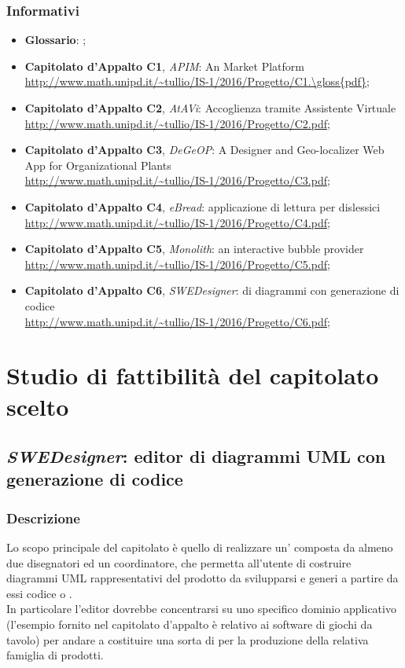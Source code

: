 		\subsubsection{Informativi}
		\begin{itemize}
			\item \textbf{Glossario}: \Glossario;
			\item \textbf{Capitolato d'Appalto C1}, \emph{APIM}: An  Market Platform
			\\ \url{http://www.math.unipd.it/~tullio/IS-1/2016/Progetto/C1.\gloss{pdf}};
			\item \textbf{Capitolato d'Appalto C2}, \emph{AtAVi}: Accoglienza tramite Assistente Virtuale
			\\ \url{http://www.math.unipd.it/~tullio/IS-1/2016/Progetto/C2.pdf};
			\item \textbf{Capitolato d'Appalto C3}, \emph{DeGeOP}: A Designer and Geo-localizer Web App for Organizational Plants
			\\ \url{http://www.math.unipd.it/~tullio/IS-1/2016/Progetto/C3.pdf};
			\item \textbf{Capitolato d'Appalto C4}, \emph{eBread}: applicazione di lettura per dislessici
			\\ \url{http://www.math.unipd.it/~tullio/IS-1/2016/Progetto/C4.pdf};
			\item \textbf{Capitolato d'Appalto C5}, \emph{Monolith}: an interactive bubble provider
			\\ \url{http://www.math.unipd.it/~tullio/IS-1/2016/Progetto/C5.pdf};
			\item \textbf{Capitolato d'Appalto C6}, \emph{SWEDesigner}:  di diagrammi  con generazione di codice
			\\ \url{http://www.math.unipd.it/~tullio/IS-1/2016/Progetto/C6.pdf};
		\end{itemize}


	
\section{Studio di fattibilità del capitolato scelto}
	\subsection{\emph{SWEDesigner}: editor di diagrammi UML con generazione di codice}
		\subsubsection{Descrizione}
		Lo scopo principale del capitolato è quello di realizzare un' composta da almeno due disegnatori
		ed un coordinatore, che permetta all'utente di costruire diagrammi UML rappresentativi del prodotto da svilupparsi e generi a partire da essi codice 
		 o .
		\\In particolare l'editor dovrebbe concentrarsi su uno specifico dominio applicativo (l'esempio fornito nel capitolato d'appalto è relativo ai software 
		di giochi da tavolo) per andare a costituire una sorta di  per la produzione della relativa famiglia di prodotti.
		
